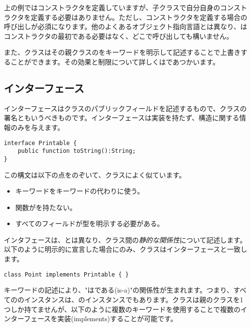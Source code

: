 上の例ではコンストラクタを定義していますが、子クラスで自分自身のコンストラクタを定義する必要はありません。ただし、コンストラクタを定義する場合の呼び出しが必須になります。他のよくあるオブジェクト指向言語とは異なり、はコンストラクタの最初である必要はなく、どこで呼び出しても構いません。

また、クラスはその親クラスのをキーワードを明示して記述することで上書きすることができます。その効果と制限について詳しくはであつかいます。


\subsection{インターフェース}
\label{types-interfaces}

インターフェースはクラスのパブリックフィールドを記述するもので、クラスの署名ともいうべきものです。インターフェースは実装を持たず、構造に関する情報のみを与えます。

\begin{lstlisting}
interface Printable {
	public function toString():String;
}
\end{lstlisting}
この構文は以下の点をのぞいて、クラスによく似ています。

\begin{itemize}
	\item {}キーワードをキーワードの代わりに使う。
	\item 関数がを持たない。
	\item すべてのフィールドが型を明示する必要がある。
\end{itemize}

インタフェースは、とは異なり、クラス間の\emph{静的な関係性}について記述します。以下のように明示的に宣言した場合にのみ、クラスはインターフェースと一致します。

\begin{lstlisting}
class Point implements Printable { }
\end{lstlisting}

キーワードの記述により、"はである(is-a)"の関係性が生まれます。つまり、すべてののインスタンスは、のインスタンスでもあります。クラスは親のクラスを1つしか持てませんが、以下のように複数のキーワードを使用することで複数のインターフェースを実装(implements)することが可能です。

